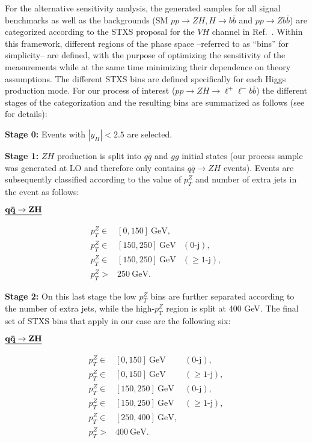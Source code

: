 For the alternative sensitivity analysis, the generated samples for all signal benchmarks as well as the backgrounds (SM $pp \to ZH, H\to b\bar{b}$ and $pp\to Zb\bar{b}$) are categorized according to the STXS proposal for the $VH$ channel in Ref.~\cite{deFlorian:2016spz}. Within this framework, different regions of the phase space --referred to as ``bins'' for simplicity-- are defined, with the purpose of optimizing the sensitivity of the measurements while at the same time minimizing their dependence on theory assumptions. The different STXS bins are defined specifically for each Higgs production mode. For our process of interest ($pp \to ZH \to \ell^+ \ell^- b\bar{b}$) the different stages of the categorization and the resulting bins are summarized as follows (see \cite{deFlorian:2016spz} for details):
\vspace{0.5cm}
%
\begin{itemize}
{\item  {\bf Stage 0:} Events with $\left|y_H\right| <2.5$ are selected.}
%
{\item {\bf Stage 1:} $ZH$ production is split into $q\bar{q}$ and $gg$ initial states (our process sample was generated at LO and therefore only contains $q\bar{q}\to ZH$ events). Events are subsequently classified according to the value of $p_T^Z$ and number of extra jets in the event as follows:
%
\vspace{0.25cm}
%
\begin{center}
${\bf \underline{q\bar{q}\to ZH}}$
\end{center}
\begin{eqnarray}
p_T^Z \in& [0,150]~\mathrm{GeV},& \nonumber\\
%
p_T^Z \in& [150,250]~\mathrm{GeV}&(0\mbox{-}\mathrm{j}),\\
%
p_T^Z \in& [150,250]~\mathrm{GeV}&(\geq 1\mbox{-}\mathrm{j}),\nonumber\\
%
p_T^Z >&250~\mathrm{GeV}.\nonumber&
\end{eqnarray}
}
%
%
{\item {\bf Stage 2:} On this last stage the low $p_T^Z$ bins are further separated according to the number of extra jets, while the high-$p_T^Z$ region is split at 400 GeV. The final set of STXS bins that apply in our case are the following six:
%
\vspace{0.25cm}
%
\begin{center}
${\bf \underline{q\bar{q}\to ZH}}$
\end{center}
\begin{eqnarray}
p_T^Z \in& [0,150]~\mathrm{GeV}&(0\mbox{-}\mathrm{j}),\nonumber\\
%
p_T^Z \in& [0,150]~\mathrm{GeV}&(\geq 1\mbox{-}\mathrm{j}),\nonumber\nonumber\\
%
p_T^Z \in& [150,250]~\mathrm{GeV}&(0\mbox{-}\mathrm{j}),\\
%
p_T^Z \in& [150,250]~\mathrm{GeV}&(\geq 1\mbox{-}\mathrm{j}),\nonumber\\
%
p_T^Z \in& [250,400]~\mathrm{GeV},&\nonumber\\
%
p_T^Z >&400~\mathrm{GeV}.\nonumber&
\end{eqnarray}
}
\end{itemize}
